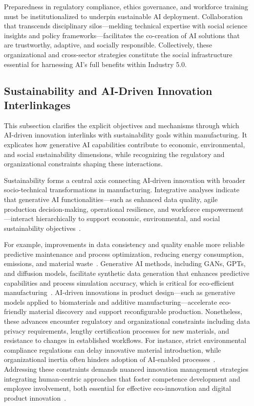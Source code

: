 \documentclass[sigconf]{acmart}
\begin{document}
Preparedness in regulatory compliance, ethics governance, and workforce training must be institutionalized to underpin sustainable AI deployment. Collaboration that transcends disciplinary silos—melding technical expertise with social science insights and policy frameworks—facilitates the co-creation of AI solutions that are trustworthy, adaptive, and socially responsible. Collectively, these organizational and cross-sector strategies constitute the social infrastructure essential for harnessing AI’s full benefits within Industry 5.0.

\subsection{Sustainability and AI-Driven Innovation Interlinkages}

This subsection clarifies the explicit objectives and mechanisms through which AI-driven innovation interlinks with sustainability goals within manufacturing. It explicates how generative AI capabilities contribute to economic, environmental, and social sustainability dimensions, while recognizing the regulatory and organizational constraints shaping these interactions.

Sustainability forms a central axis connecting AI-driven innovation with broader socio-technical transformations in manufacturing. Integrative analyses indicate that generative AI functionalities—such as enhanced data quality, agile production decision-making, operational resilience, and workforce empowerment—interact hierarchically to support economic, environmental, and social sustainability objectives~\cite{ref5}.

For example, improvements in data consistency and quality enable more reliable predictive maintenance and process optimization, reducing energy consumption, emissions, and material waste~\cite{ref11,ref36}. Generative AI methods, including GANs, GPTs, and diffusion models, facilitate synthetic data generation that enhances predictive capabilities and process simulation accuracy, which is critical for eco-efficient manufacturing~\cite{ref11}. AI-driven innovations in product design—such as generative models applied to biomaterials and additive manufacturing—accelerate eco-friendly material discovery and support reconfigurable production. Nonetheless, these advances encounter regulatory and organizational constraints including data privacy requirements, lengthy certification processes for new materials, and resistance to changes in established workflows. For instance, strict environmental compliance regulations can delay innovative material introduction, while organizational inertia often hinders adoption of AI-enabled processes~\cite{ref14,ref21}. Addressing these constraints demands nuanced innovation management strategies integrating human-centric approaches that foster competence development and employee involvement, both essential for effective eco-innovation and digital product innovation~\cite{ref14,ref21}.
\end{document}
